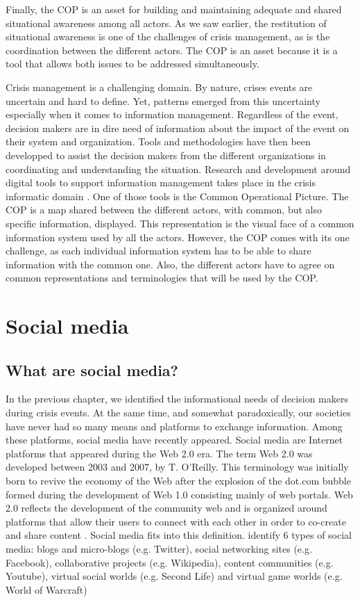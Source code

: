 Finally, the COP is an asset for building and maintaining adequate and shared situational awareness among all actors.
As we saw earlier, the restitution of situational awareness is one of the challenges of crisis management, as is the coordination between the different actors.
The COP is an asset because it is a tool that allows both issues to be addressed simultaneously.

Crisis management is a challenging domain.
By nature, crises events are uncertain and hard to define.
Yet, patterns emerged from this uncertainty especially when it comes to information management.
Regardless of the event, decision makers are in dire need of information about the impact of the event on their system and organization.
Tools and methodologies have then been developped to assist the decision makers from the different organizations in coordinating and understanding the situation.
Research and development  around digital tools to support information management takes place in the crisis informatic domain \textcite{palenCrisisInformaticsHumancentered2020}.
One of those tools is the Common Operational Picture.
The COP is a map shared between the different actors, with common, but also specific information, displayed.
This representation is the visual face of a common information system used by all the actors.
However, the COP comes with its one challenge, as each individual information system has to be able to share information with the common one.
Also, the different actors have to agree on common representations and terminologies that will be used by the COP.

\section{Social media}
\subsection{What are social media?}
In the previous chapter, we identified the informational needs of decision makers during crisis events.
At the same time, and somewhat paradoxically, our societies have never had so many means and platforms to exchange information.
Among these platforms, social media have recently appeared.
Social media are Internet platforms that appeared during the Web 2.0 era.
The term Web 2.0 was developed between 2003 and 2007, by T. O'Reilly.
This terminology was initially born to revive the economy of the Web after the explosion of the dot.com bubble formed during the development of Web 1.0 consisting mainly of web portals.
Web 2.0 reflects the development of the community web and is organized around platforms that allow their users to connect with each other in order to co-create and share content \textcite{oreillyWhatWebDesign2007b}.
Social media fits into this definition.
\textcite{kaplanUsersWorldUnite2010} identify 6 types of social media: blogs and micro-blogs (e.g. Twitter), social networking sites (e.g. Facebook), collaborative projects (e.g. Wikipedia), content communities (e.g. Youtube), virtual social worlds (e.g. Second Life) and virtual game worlds (e.g. World of Warcraft)

